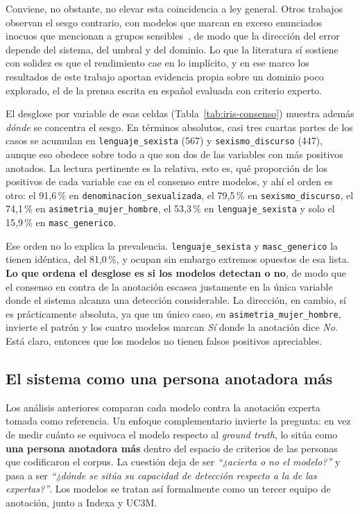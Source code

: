 Conviene, no obstante, no elevar esta coincidencia a ley general. Otros trabajos
observan el sesgo contrario, con modelos que marcan en exceso enunciados inocuos que
mencionan a grupos sensibles~\cite{zhang2024extremes}, de modo que la dirección del
error depende del sistema, del umbral y del dominio. Lo que la literatura sí
sostiene con solidez es que el rendimiento cae en lo implícito, y en ese marco los
resultados de este trabajo aportan evidencia propia sobre un dominio poco explorado,
el de la prensa escrita en español evaluada con criterio experto.

El desglose por variable de esas celdas (Tabla~\ref{tab:iris-consenso}) muestra
además \emph{dónde} se concentra el sesgo. En términos absolutos, casi tres cuartas
partes de los casos se acumulan en \texttt{lenguaje\_sexista} (567) y
\texttt{sexismo\_discurso} (447), aunque eso obedece sobre todo a que son dos de las
variables con más positivos anotados. La lectura pertinente es la relativa, esto es,
qué proporción de los positivos de cada variable cae en el consenso entre modelos, y ahí el orden es
otro: el 91,6\,\% en \texttt{denominacion\_sexualizada}, el 79,5\,\% en
\texttt{sexismo\_discurso}, el 74,1\,\% en \texttt{asimetria\_mujer\_hombre}, el
53,3\,\% en \texttt{lenguaje\_sexista} y solo el 15,9\,\% en
\texttt{masc\_generico}.

Ese orden no lo explica la prevalencia. \texttt{lenguaje\_sexista} y
\texttt{masc\_generico} la tienen idéntica, del 81,0\,\%, y ocupan sin embargo
extremos opuestos de esa lista. \textbf{Lo que ordena el desglose es si los modelos
detectan o no}, de modo que el consenso en contra de la anotación escasea justamente
en la única variable donde el sistema alcanza una detección considerable. La
dirección, en cambio, sí es prácticamente absoluta, ya que un único caso, en
\texttt{asimetria\_mujer\_hombre}, invierte el patrón y los cuatro modelos marcan
\textit{Sí} donde la anotación dice \textit{No}. Está claro, entonces que los modelos no tienen falsos positivos apreciables.



\subsection{El sistema como una persona anotadora más}
\label{subsec:iris_equipo_ia}

Los análisis anteriores comparan cada modelo contra la anotación experta tomada
como referencia. Un enfoque complementario invierte la pregunta: en vez de medir
cuánto se equivoca el modelo respecto al \textit{ground truth}, lo sitúa como \textbf{una persona
anotadora más} dentro del espacio de criterios de las personas que codificaron el
corpus. La cuestión deja de ser \textit{``¿acierta o no el modelo?''} y pasa a ser
\textit{``¿dónde se sitúa su capacidad de detección respecto a la de las expertas?''}.
Los modelos se tratan así formalmente como un tercer equipo de anotación, junto a
Indexa y UC3M.

